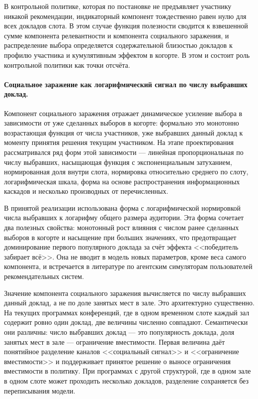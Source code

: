 В контрольной политике, которая по постановке не предъявляет участнику никакой рекомендации, индикаторный компонент тождественно равен нулю для всех докладов слота. В этом случае функция полезности сводится к взвешенной сумме компонента релевантности и компонента социального заражения, и распределение выбора определяется содержательной близостью докладов к профилю участника и кумулятивным эффектом в когорте. В этом и состоит роль контрольной политики как точки отсчёта.

\paragraph{Социальное заражение как логарифмический сигнал по числу выбравших доклад.}
Компонент социального заражения отражает динамическое усиление выбора в зависимости от уже сделанных выборов в когорте: формально это монотонно возрастающая функция от числа участников, уже выбравших данный доклад к моменту принятия решения текущим участником. На этапе проектирования рассматривался ряд форм этой зависимости --- линейная пропорциональная по числу выбравших, насыщающая функция с экспоненциальным затуханием, нормированная доля внутри слота, нормировка относительно среднего по слоту, логарифмическая шкала, форма на основе распространения информационных каскадов и несколько производных от перечисленных.

В принятой реализации использована форма с логарифмической нормировкой числа выбравших к логарифму общего размера аудитории. Эта форма сочетает два полезных свойства: монотонный рост влияния с числом ранее сделанных выборов в когорте и насыщение при больших значениях, что предотвращает доминирование первого популярного доклада за счёт эффекта <<победитель забирает всё>>. Она не вводит в модель новых параметров, кроме веса самого компонента, и встречается в литературе по агентским симуляторам пользователей рекомендательных систем.

Значение компонента социального заражения вычисляется по числу выбравших данный доклад, а не по доле занятых мест в зале. Это архитектурно существенно. На текущих программах конференций, где в одном временном слоте каждый зал содержит ровно один доклад, две величины численно совпадают. Семантически они различны: число выбравших доклад --- это популярность доклада, доля занятых мест в зале --- ограничение вместимости. Первая величина даёт понятийное разделение каналов <<социальный сигнал>> и <<ограничение вместимости>> и поддерживает принятое решение о выносе ограничения вместимости в политику. При программах с другой структурой, где в одном зале в одном слоте может проходить несколько докладов, разделение сохраняется без переписывания модели.

